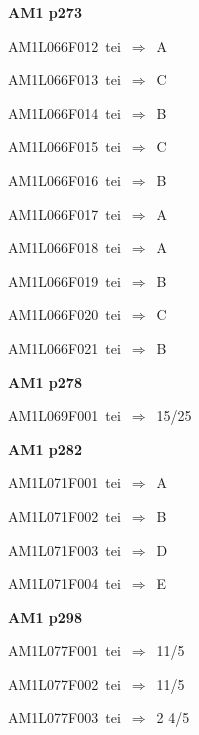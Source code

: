 \par\vfill\eject
{\bf\hfill AM1 p273\hfill\hbox{}}\par\bigskip
{\sixrm AM1L066F012\ {\sixit tei}\ }$\Rightarrow$\ A\par\smallskip
{\sixrm AM1L066F013\ {\sixit tei}\ }$\Rightarrow$\ C\par\smallskip
{\sixrm AM1L066F014\ {\sixit tei}\ }$\Rightarrow$\ B\par\smallskip
{\sixrm AM1L066F015\ {\sixit tei}\ }$\Rightarrow$\ C\par\smallskip
{\sixrm AM1L066F016\ {\sixit tei}\ }$\Rightarrow$\ B\par\smallskip
{\sixrm AM1L066F017\ {\sixit tei}\ }$\Rightarrow$\ A\par\smallskip
{\sixrm AM1L066F018\ {\sixit tei}\ }$\Rightarrow$\ A\par\smallskip
{\sixrm AM1L066F019\ {\sixit tei}\ }$\Rightarrow$\ B\par\smallskip
{\sixrm AM1L066F020\ {\sixit tei}\ }$\Rightarrow$\ C\par\smallskip
{\sixrm AM1L066F021\ {\sixit tei}\ }$\Rightarrow$\ B\par\smallskip

\par\vfill\eject
{\bf\hfill AM1 p278\hfill\hbox{}}\par\bigskip
{\sixrm AM1L069F001\ {\sixit tei}\ }$\Rightarrow$\ 15/25\par\smallskip

\par\vfill\eject
{\bf\hfill AM1 p282\hfill\hbox{}}\par\bigskip
{\sixrm AM1L071F001\ {\sixit tei}\ }$\Rightarrow$\ {\tenit A}\par\smallskip
{\sixrm AM1L071F002\ {\sixit tei}\ }$\Rightarrow$\ {\tenit B}\par\smallskip
{\sixrm AM1L071F003\ {\sixit tei}\ }$\Rightarrow$\ {\tenit D}\par\smallskip
{\sixrm AM1L071F004\ {\sixit tei}\ }$\Rightarrow$\ {\tenit E}\par\smallskip

\par\vfill\eject
{\bf\hfill AM1 p298\hfill\hbox{}}\par\bigskip
{\sixrm AM1L077F001\ {\sixit tei}\ }$\Rightarrow$\ 11/5\par\smallskip
{\sixrm AM1L077F002\ {\sixit tei}\ }$\Rightarrow$\ 11/5\par\smallskip
{\sixrm AM1L077F003\ {\sixit tei}\ }$\Rightarrow$\ 2 4/5\par\smallskip


